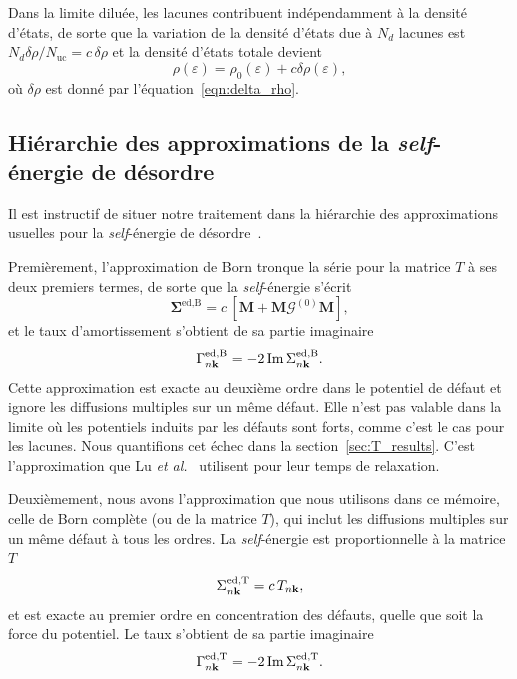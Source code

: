 Dans la limite diluée, les lacunes contribuent indépendamment à la densité d'états, de sorte que la variation de la densité d'états due à $N_d$ lacunes est $N_d\delta\rho/N_\text{uc}=c\,\delta\rho$ et la densité d'états totale devient
\begin{equation}
    \rho(\varepsilon) = \rho_0(\varepsilon) + c\delta\rho(\varepsilon),
\end{equation}
où $\delta\rho$ est donné par l'équation~\eqref{eqn:delta_rho}.

\subsection{Hiérarchie des approximations de la \textit{self}-énergie de désordre}\label{sec:T_approx}

Il est instructif de situer notre traitement dans la hiérarchie des approximations usuelles pour la \textit{self}-énergie de désordre~\cite{elliottTheoryPropertiesRandomly1974}.

\bigskip
{}

Premièrement, l'approximation de Born tronque la série pour la matrice $T$ à ses deux premiers termes, de sorte que la \textit{self}-énergie s'écrit
\begin{equation}
    \bm\Sigma^{\text{ed},\text{B}} = c\,[\bm M+\bm M\bm{\mathcal{G}}^{(0)}\bm M],\label{eqn:born}
\end{equation}
et le taux d'amortissement s'obtient de sa partie imaginaire
\begin{equation}
    \Gamma^\text{ed,B}_{n\mathbf{k}} = -2\,\mathrm{Im}\,\Sigma_{n\mathbf{k}}^\text{ed,B}.
\end{equation}
Cette approximation est exacte au deuxième ordre dans le potentiel de défaut et ignore les diffusions multiples sur un même défaut. Elle n'est pas valable dans la limite où les potentiels induits par les défauts sont forts, comme c'est le cas pour les lacunes. Nous quantifions cet échec dans la section~\ref{sec:T_results}. C'est l'approximation que Lu \textit{et al.}~\cite{luEfficientInitioCalculations2019} utilisent pour leur temps de relaxation.

\bigskip
{}

Deuxièmement, nous avons l'approximation que nous utilisons dans ce mémoire, celle de Born complète (ou de la matrice $T$), qui inclut les diffusions multiples sur un même défaut à tous les ordres. La \textit{self}-énergie est proportionnelle à la matrice $T$
\begin{equation}
    \Sigma_{n\mathbf{k}}^{\text{ed,T}}= c\,T_{n\mathbf{k}},
\end{equation}
et est exacte au premier ordre en concentration des défauts, quelle que soit la force du potentiel. Le taux s'obtient de sa partie imaginaire
\begin{equation}
        \Gamma^\text{ed,T}_{n\mathbf{k}} = -2\,\mathrm{Im}\,\Sigma_{n\mathbf{k}}^\text{ed,T}.
\end{equation}


